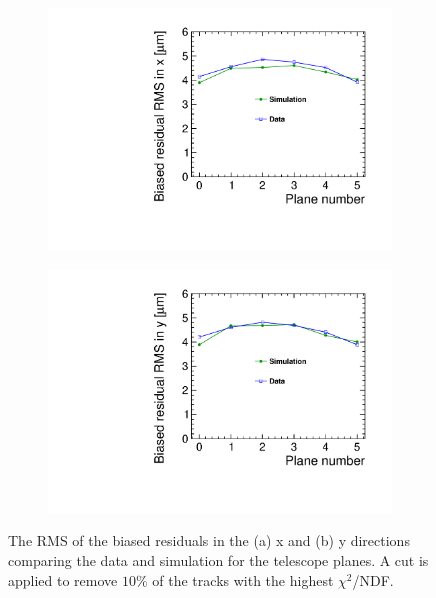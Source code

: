 \begin{figure}[htbp] \centering
  \begin{subfigure}[b]{0.45\textwidth}
    \includegraphics[width=\textwidth]{figures/Telescope/biasedResiduals/RMSX_simu_vs_data.pdf}
    \caption{}
  \end{subfigure}\hfill
  \begin{subfigure}[b]{0.45\textwidth}
    \includegraphics[width=\textwidth]{figures/Telescope/biasedResiduals/RMSY_simu_vs_data.pdf}
    \caption{}
  \end{subfigure}
  \caption{The RMS of the biased residuals in the (a) x and (b) y
    directions comparing the data and simulation for the telescope
    planes. A cut is applied to remove $10\%$ of the tracks with the
    highest $\chi^2$/NDF.}
  \label{fig:telescopeBiasedRMS_data_simu}
\end{figure}


